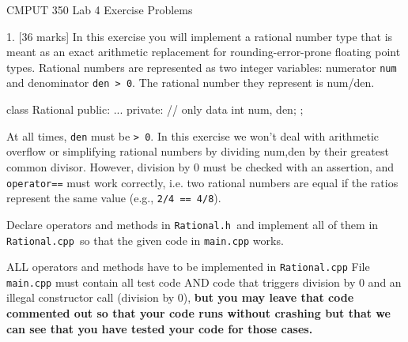 \documentclass[a4paper,11pt]{article}
\begin{document}

\begin{center}
{\Large CMPUT 350 Lab 4 Exercise Problems}
\end{center}



1. [36 marks] In this exercise you will implement a rational number type that is meant as an
exact arithmetic replacement for rounding-error-prone floating point
types. Rational numbers are represented as two integer variables: numerator
\texttt{num} and denominator \texttt{den > 0}. The rational number they represent is num/den.

\begin{cppcode}
class Rational {
public:
    ...
private:
    // only data
    int num, den;
};
\end{cppcode}


At all times, \texttt{den} must be \texttt{> 0}. In this exercise we won't deal with arithmetic
overflow or simplifying rational numbers by dividing num,den by their greatest
common divisor. However, division by 0 must be checked with an assertion, and
\texttt{operator==} must work correctly, i.e. two rational numbers are equal if the
ratios represent the same value (e.g., \texttt{2/4 == 4/8}).

\pagebreak

Declare operators and methods in \texttt{Rational.h }and implement all of them in
\texttt{Rational.cpp }so that the given code in \texttt{main.cpp} works.

ALL operators and methods have to be implemented in \texttt{Rational.cpp}
File \texttt{main.cpp} must contain all test code AND code that triggers division by
0 and an illegal constructor call (division by 0),
\textbf{but you may leave that code commented out so that your code runs without 
crashing but that we can see that you have tested your code for those cases.}
\end{document}
